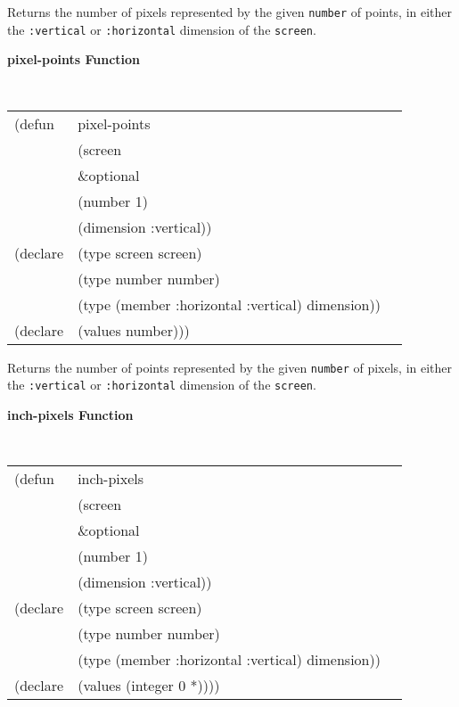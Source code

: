 \begin{flushright} \parbox[t]{6.125in}{
Returns the number of pixels represented by the given {\tt number} of points, in
either the {\tt :vertical} or {\tt :horizontal} dimension of the {\tt screen}.
}\end{flushright}


{\samepage
{\large {\bf pixel-points \hfill Function}} 
\begin{flushright} 
\parbox[t]{6.125in}{
\tt
\begin{tabular}{lll}
\raggedright
(defun & pixel-points \\
       & (screen \\
       & \&optional \\
       & (number 1) \\
       & (dimension :vertical))\\
(declare & (type screen  screen)\\
	  &(type number  number)\\
	  &(type (member :horizontal :vertical)  dimension)) \\ 
(declare & (values number)))
\end{tabular}
\rm
}\end{flushright}}

\begin{flushright} \parbox[t]{6.125in}{
Returns the number of points represented by the given {\tt number} of pixels, in
either the {\tt :vertical} or {\tt :horizontal} dimension of the {\tt screen}.
}\end{flushright}


{\samepage
{\large {\bf inch-pixels \hfill Function}} 
\begin{flushright} 
\parbox[t]{6.125in}{
\tt
\begin{tabular}{lll}
\raggedright
(defun & inch-pixels \\
       & (screen \\
       & \&optional \\
       & (number 1) \\
       & (dimension :vertical))\\
(declare & (type screen  screen)\\
	  &(type number  number)\\
	  &(type (member :horizontal :vertical)  dimension)) \\ 
(declare & (values (integer 0 *))))
\end{tabular}
\rm
}\end{flushright}}

